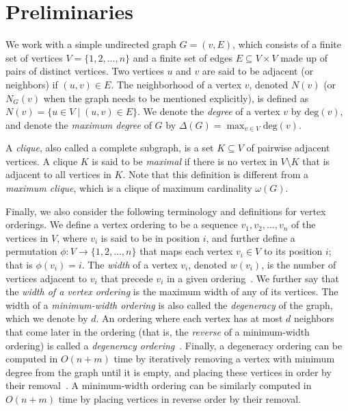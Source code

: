 \documentclass[final,1p]{elsarticle-modified}
\newcommand{\dd}{\ensuremath{\mathrm{deg}}}
\begin{document}
\section{Preliminaries}
\label{section:preliminaries}
We work with a simple undirected graph $G=(v,E)$, which consists of a finite set of vertices $V=\{1,2,\ldots,n\}$ and a finite set of edges $E\subseteq V \times V$ made up of pairs of distinct vertices. Two vertices $u$ and $v$ are said to be adjacent (or neighbors) if $(u,v)\in E$. The neighborhood of a vertex $v$, denoted $N(v)$ (or $N_G(v)$ when the graph needs to be mentioned explicitly), is defined as $N(v)=\{u\in V\mid(u,v)\in E\}$. We denote the \emph{degree} of a vertex $v$ by $\dd(v)$, and denote the \emph{maximum degree} of $G$ by $\Delta(G) = \max_{v\in V}\dd(v)$.

A \emph{clique}, also called a complete subgraph, is a set $K\subseteq V$ of pairwise adjacent vertices. A clique $K$ is said to be \emph{maximal} if there is no vertex in $V\setminus K$ that is adjacent to all vertices in $K$. Note that this definition is different from a \emph{maximum clique}, which is a clique of maximum cardinality $\omega(G)$.

Finally, we also consider the following terminology and definitions for vertex orderings. We define a vertex ordering to be a sequence $v_1,v_2,\ldots,v_n$ of the vertices in $V$, where $v_i$ is said to be in position $i$, and further define a permutation $\phi:V\rightarrow\{1,2,\ldots,n\}$ that maps each vertex $v_i\in V$ to its position $i$; that is $\phi(v_i) = i$. The \emph{width} of a vertex $v_i$, denoted $w(v_i)$, is the number of vertices adjacent to $v_i$ that precede $v_i$ in a given ordering~\cite{freuder-1982}. We further say that the \emph{width of a vertex ordering} is the maximum width of any of its vertices. The width of a \emph{minimum-width ordering} is also called the \emph{degeneracy} of the graph, which we denote by $d$. An ordering where each vertex has at most $d$ neighbors that come later in the ordering (that is, the \emph{reverse} of a minimum-width ordering) is called a \emph{degeneracy ordering}~\cite{els-2013}. Finally, a degeneracy ordering can be computed in $O(n+m)$ time by iteratively removing a vertex with minimum degree from the graph until it is empty, and placing these vertices in order by their removal~\cite{matula-1983}. A minimum-width ordering can be similarly computed in $O(n+m)$ time by placing vertices in reverse order by their removal.

\end{document}
